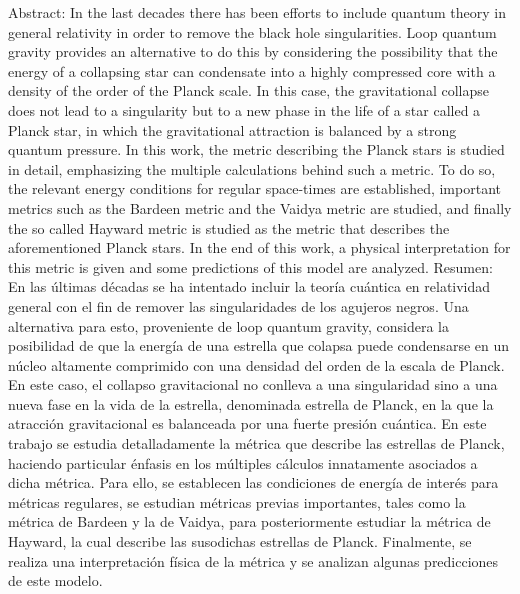 \documentclass[16pt,a4paper]{article}
\numberwithin{equation}{section}
\theoremstyle{definition}
\begin{document}
\doublespacing
\newpage
\vspace*{\fill}
\noindent
\huge{Abstract:}
\newline\newline
\normalsize
In the last decades there has been efforts to include quantum theory in general relativity in order to remove the black hole singularities. Loop quantum gravity provides an alternative to do this by considering the possibility that the energy of a collapsing star can condensate into a highly compressed core with a density of the order of the Planck scale. In this case, the gravitational collapse does not lead to a singularity but to a new phase in the life of a star called a Planck star, in which the gravitational attraction is balanced by a strong quantum pressure. In this work, the metric describing the Planck stars is studied in detail, emphasizing the multiple calculations behind such a metric. To do so, the relevant energy conditions for regular space-times are established, important metrics such as the Bardeen metric and the Vaidya metric are studied, and finally the so called Hayward metric is studied as the metric that describes the aforementioned Planck stars. In the end of this work, a physical interpretation for this metric is given and some predictions of this model are analyzed.
\vspace*{2cm}
\newline\newline
\huge{Resumen:}
\newline\newline
\normalsize
En las últimas décadas se ha intentado incluir la teoría cuántica en relatividad general con el fin de remover las singularidades de los agujeros negros. Una alternativa para esto, proveniente de loop quantum gravity, considera la posibilidad de que la energía de una estrella que colapsa puede condensarse en un núcleo altamente comprimido con una densidad del orden de la escala de Planck. En este caso, el collapso gravitacional no conlleva a una singularidad sino a una nueva fase en la vida de la estrella, denominada estrella de Planck, en la que la atracción gravitacional es balanceada por una fuerte presión cuántica. En este trabajo se estudia detalladamente la métrica que describe las estrellas de Planck, haciendo particular énfasis en los múltiples cálculos innatamente asociados a dicha métrica. Para ello, se establecen las condiciones de energía de interés para métricas regulares, se estudian métricas previas importantes, tales como la métrica de Bardeen y la de Vaidya, para posteriormente estudiar la métrica de Hayward, la cual describe las susodichas estrellas de Planck. Finalmente, se realiza una interpretación física de la métrica y se analizan algunas predicciones de este modelo.
\vspace*{\fill}
\end{document}
